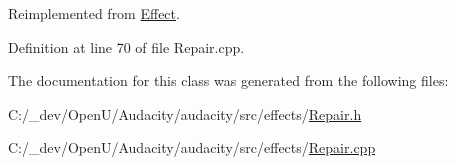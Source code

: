 Reimplemented from \hyperlink{class_effect_a005d1433b7d816b0765a0a72a086061c}{Effect}.



Definition at line 70 of file Repair.\+cpp.



The documentation for this class was generated from the following files\+:\begin{DoxyCompactItemize}
\item 
C\+:/\+\_\+dev/\+Open\+U/\+Audacity/audacity/src/effects/\hyperlink{_repair_8h}{Repair.\+h}\item 
C\+:/\+\_\+dev/\+Open\+U/\+Audacity/audacity/src/effects/\hyperlink{_repair_8cpp}{Repair.\+cpp}\end{DoxyCompactItemize}
